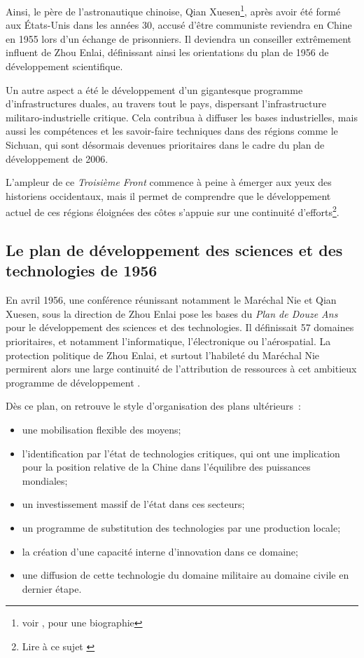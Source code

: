 \documentclass[a4paper]{article}
\begin{document}
Ainsi, le père de l’astronautique chinoise, Qian Xuesen\footnote{voir \cite{chang95_thread}, pour une biographie}, après avoir été formé aux États-Unis dans les années 30, accusé d’être communiste reviendra en Chine en 1955 lors d’un échange de prisonniers. Il deviendra un conseiller extrêmement influent de Zhou Enlai, définissant ainsi les orientations du plan de 1956 de développement scientifique.

Un autre aspect a été le développement d’un gigantesque programme d’infra\-structures duales, au travers tout le pays, dispersant l’infrastructure militaro-industrielle critique. Cela contribua à diffuser les bases industrielles, mais aussi les compétences et les savoir-faire techniques dans des régions comme le Sichuan, qui sont désormais devenues prioritaires dans le cadre du plan de développement de 2006.

L’ampleur de ce \textit{Troisième Front} commence à peine à émerger aux yeux des historiens occidentaux, mais il permet de comprendre que le développement actuel de ces régions éloignées des côtes s’appuie sur une continuité d’efforts\footnote{Lire à ce sujet \cite{meyskens20_maos}}.


\subsection{Le plan de développement des sciences et des technologies de 1956}
\label{sec:org13d69c0}
En avril 1956, une conférence réunissant notamment le Maréchal Nie et Qian Xuesen, sous la direction de Zhou Enlai pose les bases du \textit{Plan de Douze Ans} pour le développement des sciences et des technologies. Il définissait 57 domaines prioritaires, et notamment l’informatique, l’électronique ou l’aérospatial. La protection politique de Zhou Enlai, et surtout l’habileté du Maréchal Nie permirent alors une large continuité de l’attribution de ressources à cet ambitieux programme de développement \cite{feigenbaum03_chinas}. 

Dès ce plan, on retrouve le style d’organisation des plans ultérieurs~:
\begin{itemize}
\item une mobilisation flexible des moyens;
\item l’identification par l’état de technologies critiques, qui ont une implication pour la position relative de la Chine dans l’équilibre des puissances mondiales;
\item un investissement massif de l’état dans ces secteurs;
\item un programme de substitution des technologies par une production locale;
\item la création d’une capacité interne d’innovation dans ce domaine;
\item une diffusion de cette technologie du domaine militaire au domaine civile en dernier étape.
\end{itemize}
\end{document}
